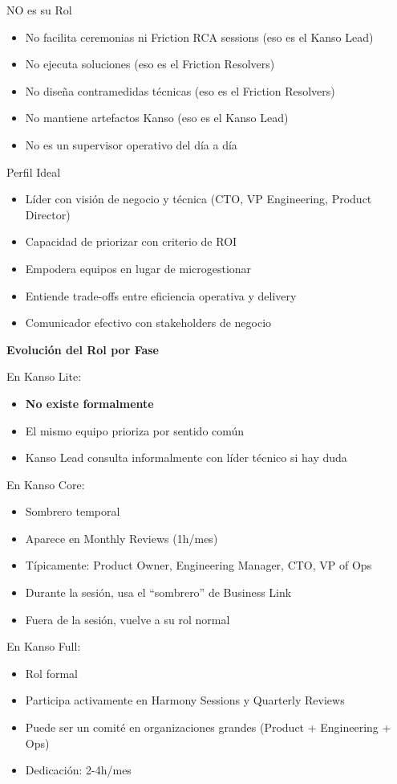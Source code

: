 NO es su Rol
\begin{itemize}
    \item No facilita ceremonias ni Friction RCA sessions (eso es el Kanso Lead)
    \item No ejecuta soluciones (eso es el Friction Resolvers)
    \item No diseña contramedidas técnicas (eso es el Friction Resolvers)
    \item No mantiene artefactos Kanso (eso es el Kanso Lead)
    \item No es un supervisor operativo del día a día
\end{itemize}

Perfil Ideal
\begin{itemize}
    \item Líder con visión de negocio y técnica (CTO, VP Engineering, Product Director)
    \item Capacidad de priorizar con criterio de ROI
    \item Empodera equipos en lugar de microgestionar
    \item Entiende trade-offs entre eficiencia operativa y delivery
    \item Comunicador efectivo con stakeholders de negocio
\end{itemize}


\textbf{Evolución del Rol por Fase}

En Kanso Lite:
\begin{itemize}
    \item \textbf{No existe formalmente}
    \item El mismo equipo prioriza por sentido común
    \item Kanso Lead consulta informalmente con líder técnico si hay duda
\end{itemize}

En Kanso Core:
\begin{itemize}
    \item Sombrero temporal
    \item Aparece en Monthly Reviews (1h/mes)
    \item Típicamente: Product Owner, Engineering Manager, CTO, VP of Ops
    \item Durante la sesión, usa el ``sombrero'' de Business Link
    \item Fuera de la sesión, vuelve a su rol normal
\end{itemize}

En Kanso Full:
\begin{itemize}
    \item Rol formal
    \item Participa activamente en Harmony Sessions y Quarterly Reviews
    \item Puede ser un comité en organizaciones grandes (Product + Engineering + Ops)
    \item Dedicación: 2-4h/mes
\end{itemize}

